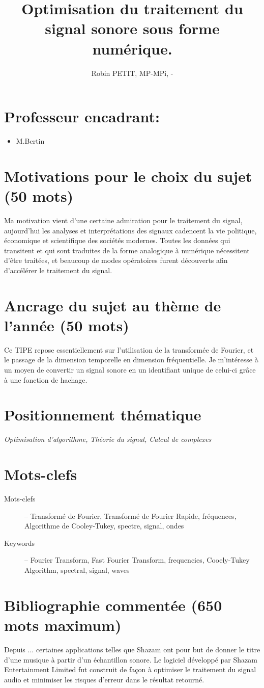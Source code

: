 \documentclass[12pt,a4paper]{article}
\title{Optimisation du traitement du signal sonore sous forme numérique.}
\author{Robin PETIT, MP\oldstylenums{1}-MPi, \oldstylenums{\the\year}-\oldstylenums{\arabic{nextyear}} }
\date{}
\newcommand{\positionnementThematique}[1]{
\section*{Positionnement thématique}
{\it #1}}
\newcommand{\motclefs}[2]{
    \section*{Mots-clefs}
        \begin{description}
            \item[Mots-clefs] -- #1 
            \item[Keywords]   -- #2
        \end{description}
}
\begin{document}
\maketitle
\section*{Professeur encadrant:}
\begin{itemize}
	\item M.Bertin
\end{itemize}
\section*{Motivations pour le choix du sujet (50 mots)}
Ma motivation vient d'une certaine admiration pour le traitement du signal, aujourd'hui les analyses et interprétations des signaux cadencent la vie politique, économique et scientifique des sociétés modernes. Toutes les données qui transitent et qui sont traduites de la forme analogique à numérique nécessitent d'être traitées, et beaucoup de modes opératoires furent découverts afin d'accélérer le traitement du signal.
\section*{Ancrage du sujet au thème de l'année (50 mots)}
Ce TIPE repose essentiellement sur l'utilisation de la transformée de Fourier, et le passage de la dimension temporelle en dimension fréquentielle. Je m'intéresse à un moyen de convertir un signal sonore en un identifiant unique de celui-ci grâce à une fonction de hachage.
\positionnementThematique{Optimisation d'algorithme, Théorie du signal, Calcul de complexes }
\motclefs{Transformé de Fourier, Transformé de Fourier Rapide, fréquences, Algorithme de Cooley-Tukey, spectre, signal, ondes}{Fourier Transform, Fast Fourier Transform, frequencies, Cooely-Tukey Algorithm, spectral, signal, waves}
\section*{Bibliographie commentée (650 mots maximum)}
Depuis ... certaines applications telles que Shazam ont pour but de donner le titre d'une musique à partir d'un échantillon sonore. Le logiciel développé par Shazam Entertainment Limited fut construit de façon à optimiser le traitement du signal audio et minimiser les risques d'erreur dans le résultat retourné.
\end{document}
